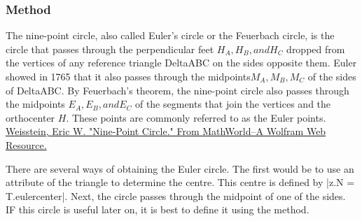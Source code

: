 

\subsubsection{Method } %
\label{ssub:method_imeth_triangle_euler_circle}

The nine-point circle, also called Euler's circle or the Feuerbach circle, is the circle that passes through the perpendicular feet $H_A,  H_B, and H_C$ dropped from the vertices of any reference triangle DeltaABC on the sides opposite them. Euler showed in 1765 that it also passes through the midpoints$ M_A, M_B, M_C$ of the sides of DeltaABC. By Feuerbach's theorem, the nine-point circle also passes through the midpoints $E_A, E_B, and E_C$ of the segments that join the vertices and the orthocenter $H$. These points are commonly referred to as the Euler points.
\href{https://mathworld.wolfram.com/Nine-PointCircle.html}{Weisstein, Eric W. "Nine-Point Circle." From MathWorld--A Wolfram Web Resource.}

\vspace{6pt}
There are several ways of obtaining the Euler circle. The first would be to use an attribute of the triangle to determine the centre. This centre is defined by |z.N = T.eulercenter|. Next, the circle passes through the midpoint of one of the sides. IF this circle is useful later on, it is best to define it using the  method.

